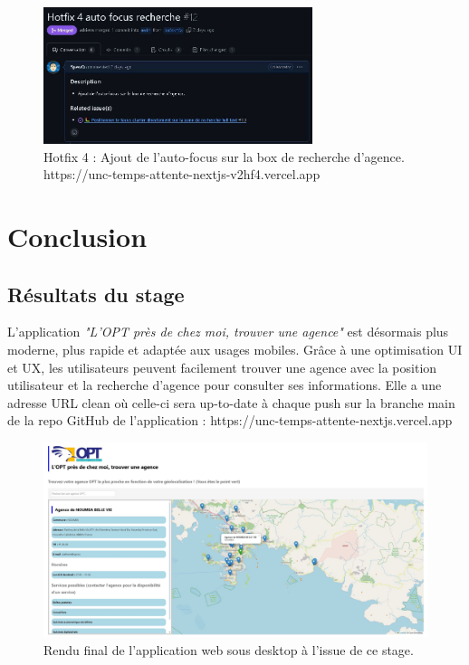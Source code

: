 \documentclass[12pt,a4paper]{report}
\begin{document}
\begin{figure}[h] %
    \centering
    \includegraphics[width=0.7\textwidth]{ressources_rapport/extrait_pr_12.JPG}
    \caption{Hotfix 4 : Ajout de l'auto-focus sur la box de recherche d'agence. https://unc-temps-attente-nextjs-v2hf4.vercel.app}
    \label{fig:exemple}
\end{figure}

\chapter{Conclusion}
\section{Résultats du stage}
L’application \textit{"L'OPT près de chez moi, trouver une agence"} est désormais plus moderne, plus rapide et adaptée aux usages mobiles. Grâce à une optimisation UI et UX, les utilisateurs peuvent facilement trouver une agence avec la position utilisateur et la recherche d'agence pour consulter ses informations. Elle a une adresse URL clean où celle-ci sera up-to-date à chaque push sur la branche main de la repo GitHub de l'application : https://unc-temps-attente-nextjs.vercel.app
\begin{figure}[h] %
    \centering
    \includegraphics[width=1\textwidth]{ressources_rapport/app_opt.JPG}
    \caption{Rendu final de l'application web sous desktop à l'issue de ce stage.}
    \label{fig:exemple}
\end{figure}
\newpage
\end{document}
